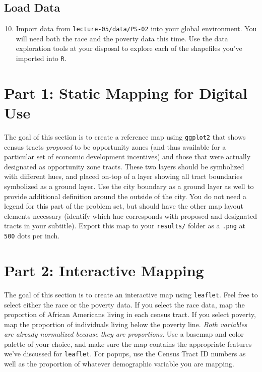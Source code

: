 \documentclass{tufte-handout}
\begin{document}
\vspace{3mm}
\subsection{Load Data}
\begin{enumerate}[label=\alph*.]
\setcounter{enumi}{9}
\item Import data from \texttt{lecture-05/data/PS-02} into your global environment. You will need both the race and the poverty data this time. Use the data exploration tools at your disposal to explore each of the shapefiles you've imported into \texttt{R}.
\end{enumerate}

\vspace{5mm}
\section{Part 1: Static Mapping for Digital Use}
The goal of this section is to create a reference map using \texttt{ggplot2} that shows census tracts \textit{proposed} to be opportunity zones (and thus available for a particular set of economic development incentives) and those that were actually designated as opportunity zone tracts. These two layers should be symbolized with different hues, and placed on-top of a layer showing all tract boundaries symbolized as a ground layer. Use the city boundary as a ground layer as well to provide additional definition around the outside of the city. You do not need a legend for this part of the problem set, but should have the other map layout elements necessary (identify which hue corresponds with proposed and designated tracts in your subtitle). Export this map to your \texttt{results/} folder as a \texttt{.png} at \texttt{500} dots per inch.

\vspace{5mm}
\section{Part 2: Interactive Mapping}
The goal of this section is to create an interactive map using \texttt{leaflet}. Feel free to select either the race or the poverty data. If you select the race data, map the proportion of African Americans living in each census tract. If you select poverty, map the proportion of individuals living below the poverty line. \textit{Both variables are already normalized because they are proportions}. Use a basemap and color palette of your choice, and make sure the map contains the appropriate features we've discussed for \texttt{leaflet}. For popups, use the Census Tract ID numbers as well as the proportion of whatever demographic variable you are mapping.
\end{document}

